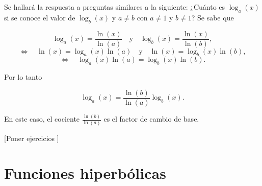\documentclass[pts12]{article}
\numberwithin{equation}{section}
\newcommand{\Col}{\color{ProcessBlue}}
\begin{document}
Se hallará la respuesta a preguntas similares a la siguiente: ¿Cuánto es $\log_a(x)$ si se conoce el valor de $\log_b(x)$ y $a\neq b$ con $a\neq 1$ y $b\neq 1$? Se sabe que 

$$\log_a(x)=\frac{\ln(x)}{\ln(a)} \quad \mbox{y} \quad \log_b(x)=\frac{\ln(x)}{\ln(b)},$$
$$\Leftrightarrow \quad \ln(x)=\log_a(x)\ln(a) \quad \mbox{y} \quad \ln(x)=\log_b(x)\ln(b), $$
$$\Leftrightarrow \quad \log_a(x)\ln(a)=\log_b(x)\ln(b).$$

Por lo tanto

$$\log_a(x)= \frac{\ln(b)}{\ln(a)}\log_b(x).$$

En este caso, el cociente $\frac{\ln(b)}{\ln(a)}$ es el factor de cambio de base.

[Poner ejercicios ]

\section{\Col Funciones hiperbólicas}
\end{document}
